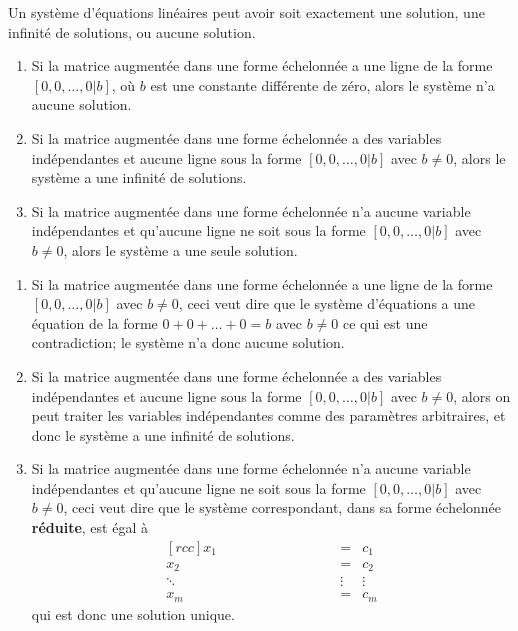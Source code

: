 \begin{theo}\label{thm:nbsol}
	Un système d'équations linéaires peut avoir soit exactement une solution, une infinité de solutions, ou aucune solution.
	\begin{enumerate}
	\item Si la matrice augmentée dans une forme échelonnée a une ligne de la forme $[0, 0, \ldots, 0 | b]$, où $b$ est une
	constante différente de zéro, alors le système n'a aucune solution.
	\item Si la matrice augmentée dans une forme échelonnée a des variables indépendantes et aucune ligne
	sous la forme $[0, 0, \ldots, 0 | b]$ avec $b\ne0$, alors le système a une infinité de solutions.
	\item Si la matrice augmentée dans une forme échelonnée n'a aucune variable indépendantes et qu'aucune
	ligne ne soit sous la forme $[0, 0, \ldots, 0 | b]$ avec $b\ne0$, alors le système a une seule solution.
	\end{enumerate}
\proof

	\begin{enumerate}
	\item Si la matrice augmentée dans une forme échelonnée a une ligne de la forme $[0, 0, \ldots, 0 | b]$  avec $b\ne0$,
	ceci veut dire que le système d'équations a une équation de la forme $0+0+\ldots+0=b$  avec $b\ne0$ ce qui
	est une contradiction; le système n'a donc aucune solution.
	\item Si la matrice augmentée dans une forme échelonnée a des variables indépendantes et aucune ligne
	sous la forme $[0, 0, \ldots, 0 | b]$ avec $b\ne0$, alors on peut traiter les variables indépendantes
	comme des paramètres arbitraires, et donc le système a une infinité de solutions.
	\item  Si la matrice augmentée dans une forme échelonnée n'a aucune variable indépendantes et qu'aucune
	ligne ne soit sous la forme $[0, 0, \ldots, 0 | b]$ avec $b\ne0$, ceci veut dire que le système correspondant,
	dans sa forme échelonnée \textbf{réduite}, est égal à
	\[
	\begin{matrix}[rcc]
	x_1 \qquad\qquad\qquad\qquad&=& c_1 \\
	x_2\qquad\qquad \qquad&=& c_2 \\
	\ddots\qquad \qquad&\vdots&\vdots\\
	x_m &=& c_m
	\end{matrix}
	\]
	qui est donc une solution unique.
	\end{enumerate}

\end{theo}
